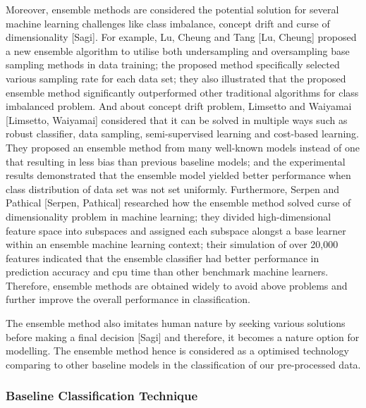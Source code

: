 \documentclass[runningheads]{llncs}
\begin{document}
Moreover, ensemble methods are considered the potential solution for several machine learning challenges like class imbalance, concept drift and curse of dimensionality [Sagi]. For example, Lu, Cheung and Tang [Lu, Cheung] proposed a new ensemble algorithm to utilise both undersampling and oversampling base sampling methods in data training; the proposed method specifically selected various sampling rate for each data set; they also illustrated that the proposed ensemble method significantly outperformed other traditional algorithms for class imbalanced problem. And about concept drift problem, Limsetto and Waiyamai [Limsetto, Waiyamai] considered that it can be solved in multiple ways such as robust classifier, data sampling, semi-supervised learning and cost-based learning. They proposed an ensemble method from many well-known models instead of one that resulting in less bias than previous baseline models; and the experimental results demonstrated that the ensemble model yielded better performance when class distribution of data set was not set uniformly. Furthermore, Serpen and Pathical [Serpen, Pathical] researched how the ensemble method solved curse of dimensionality problem in machine learning; they divided high-dimensional feature space into subspaces and assigned each subspace alongst a base learner within an ensemble machine learning context; their simulation of over 20,000 features indicated that the ensemble classifier had better performance in prediction accuracy and cpu time than other benchmark machine learners. Therefore, ensemble methods are obtained widely to avoid above problems and further improve the overall performance in classification.

The ensemble method also imitates human nature by seeking various solutions before making a final decision [Sagi] and therefore, it becomes a nature option for modelling. The ensemble method hence is considered as a optimised technology comparing to other baseline models in the classification of our pre-processed data.
%
%
\subsubsection{Baseline Classification Technique}
%
\end{document}
